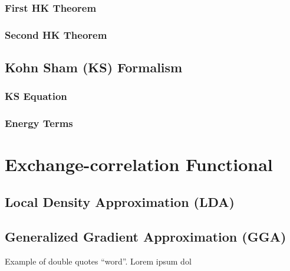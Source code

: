     \subsubsection{First HK Theorem}
        \subsubsection{Second HK Theorem}
    \subsection{Kohn Sham (KS) Formalism}
        \subsubsection{KS Equation}
        \subsubsection{Energy Terms}
\section{Exchange-correlation Functional}
    \subsection{Local Density Approximation (LDA)}
    \subsection{Generalized Gradient Approximation (GGA)}

Example of double quotes ``word''. Lorem ipsum dol